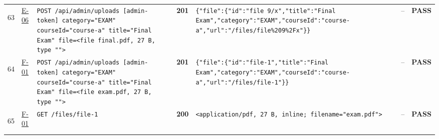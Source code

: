 \documentclass[10pt,a4paper]{article}
\begin{document}
\begin{landscape}
\begin{longtable}{@{}P{0.6cm}P{0.9cm}P{8.5cm}P{1.0cm}P{6.2cm}P{4.2cm}P{1.1cm}@{}}
\hypertarget{call63}{63} & \hyperlink{test-E-06}{E-06} & \texttt{POST /\allowbreak{}api/\allowbreak{}admin/\allowbreak{}uploads [admin-\allowbreak{}token] category=\allowbreak{}"\allowbreak{}EXAM"\allowbreak{} courseId=\allowbreak{}"\allowbreak{}course-\allowbreak{}a"\allowbreak{} title=\allowbreak{}"\allowbreak{}Final Exam"\allowbreak{} file=\allowbreak{}<file final.\allowbreak{}pdf,\allowbreak{} 27 B,\allowbreak{} type "\allowbreak{}"\allowbreak{}>} & \textcolor{passgreen}{\textbf{201}} & \texttt{\{"\allowbreak{}file"\allowbreak{}:\allowbreak{}\{"\allowbreak{}id"\allowbreak{}:\allowbreak{}"\allowbreak{}file 9/\allowbreak{}x"\allowbreak{},\allowbreak{}"\allowbreak{}title"\allowbreak{}:\allowbreak{}"\allowbreak{}Final Exam"\allowbreak{},\allowbreak{}"\allowbreak{}category"\allowbreak{}:\allowbreak{}"\allowbreak{}EXAM"\allowbreak{},\allowbreak{}"\allowbreak{}courseId"\allowbreak{}:\allowbreak{}"\allowbreak{}course-\allowbreak{}a"\allowbreak{},\allowbreak{}"\allowbreak{}url"\allowbreak{}:\allowbreak{}"\allowbreak{}/\allowbreak{}files/\allowbreak{}file\%209\%2Fx"\allowbreak{}\}\}} & -- & \textcolor{passgreen}{\textbf{PASS}} \\
\hypertarget{call64}{64} & \hyperlink{test-F-01}{F-01} & \texttt{POST /\allowbreak{}api/\allowbreak{}admin/\allowbreak{}uploads [admin-\allowbreak{}token] category=\allowbreak{}"\allowbreak{}EXAM"\allowbreak{} courseId=\allowbreak{}"\allowbreak{}course-\allowbreak{}a"\allowbreak{} title=\allowbreak{}"\allowbreak{}Final Exam"\allowbreak{} file=\allowbreak{}<file exam.\allowbreak{}pdf,\allowbreak{} 27 B,\allowbreak{} type "\allowbreak{}"\allowbreak{}>} & \textcolor{passgreen}{\textbf{201}} & \texttt{\{"\allowbreak{}file"\allowbreak{}:\allowbreak{}\{"\allowbreak{}id"\allowbreak{}:\allowbreak{}"\allowbreak{}file-\allowbreak{}1"\allowbreak{},\allowbreak{}"\allowbreak{}title"\allowbreak{}:\allowbreak{}"\allowbreak{}Final Exam"\allowbreak{},\allowbreak{}"\allowbreak{}category"\allowbreak{}:\allowbreak{}"\allowbreak{}EXAM"\allowbreak{},\allowbreak{}"\allowbreak{}courseId"\allowbreak{}:\allowbreak{}"\allowbreak{}course-\allowbreak{}a"\allowbreak{},\allowbreak{}"\allowbreak{}url"\allowbreak{}:\allowbreak{}"\allowbreak{}/\allowbreak{}files/\allowbreak{}file-\allowbreak{}1"\allowbreak{}\}\}} & -- & \textcolor{passgreen}{\textbf{PASS}} \\
\hypertarget{call65}{65} & \hyperlink{test-F-01}{F-01} & \texttt{GET /\allowbreak{}files/\allowbreak{}file-\allowbreak{}1} & \textcolor{passgreen}{\textbf{200}} & \texttt{<application/\allowbreak{}pdf,\allowbreak{} 27 B,\allowbreak{} inline; filename=\allowbreak{}"\allowbreak{}exam.\allowbreak{}pdf"\allowbreak{}>} & -- & \textcolor{passgreen}{\textbf{PASS}} \\

\end{longtable}
\end{landscape}
\end{document}
